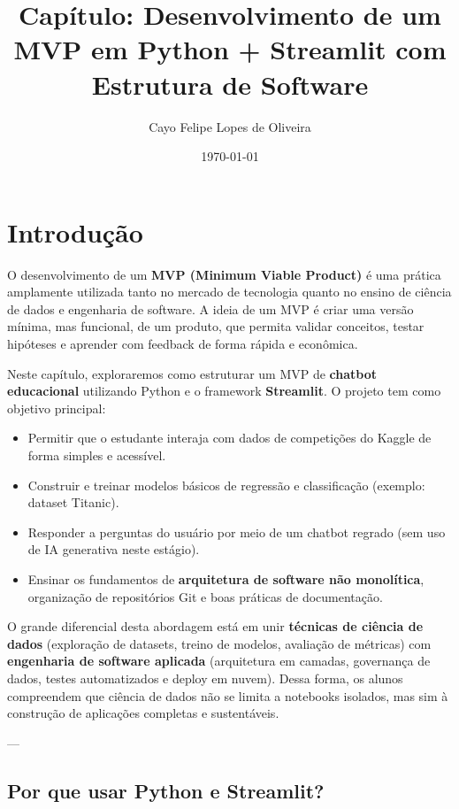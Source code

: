 \documentclass[12pt,a4paper]{article}
\title{Capítulo: Desenvolvimento de um MVP em Python + Streamlit com Estrutura de Software}
\author{Cayo Felipe Lopes de Oliveira}
\date{\today}
\begin{document}
\maketitle

\section{Introdução}

O desenvolvimento de um \textbf{MVP (Minimum Viable Product)} é uma prática amplamente utilizada tanto no mercado de tecnologia quanto no ensino de ciência de dados e engenharia de software. A ideia de um MVP é criar uma versão mínima, mas funcional, de um produto, que permita validar conceitos, testar hipóteses e aprender com feedback de forma rápida e econômica.

Neste capítulo, exploraremos como estruturar um MVP de \textbf{chatbot educacional} utilizando Python e o framework \textbf{Streamlit}. O projeto tem como objetivo principal:

\begin{itemize}
  \item Permitir que o estudante interaja com dados de competições do Kaggle de forma simples e acessível.
  \item Construir e treinar modelos básicos de regressão e classificação (exemplo: dataset Titanic).
  \item Responder a perguntas do usuário por meio de um chatbot regrado (sem uso de IA generativa neste estágio).
  \item Ensinar os fundamentos de \textbf{arquitetura de software não monolítica}, organização de repositórios Git e boas práticas de documentação.
\end{itemize}

O grande diferencial desta abordagem está em unir \textbf{técnicas de ciência de dados} (exploração de datasets, treino de modelos, avaliação de métricas) com \textbf{engenharia de software aplicada} (arquitetura em camadas, governança de dados, testes automatizados e deploy em nuvem). Dessa forma, os alunos compreendem que ciência de dados não se limita a notebooks isolados, mas sim à construção de aplicações completas e sustentáveis.

---

\subsection{Por que usar Python e Streamlit?}
\end{document}

